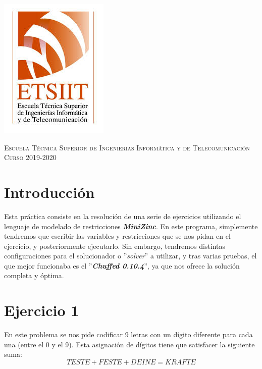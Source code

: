 \documentclass[11pt,a4paper]{article}
\begin{document}
\begin{titlepage}
\begin{minipage}{\textwidth}
\includegraphics[scale=0.3]{img/etsiit.jpeg}

\vspace{0.7cm}
\textsc{Escuela Técnica Superior de Ingenierías Informática y de Telecomunicación}\\
\vspace{1cm}
\textsc{Curso 2019-2020}
\end{minipage}
\end{titlepage}

\tableofcontents
\thispagestyle{empty}				%

\newpage

\setlength{\parskip}{1em}
\setcounter{page}{1}

\section*{Introducción}

Esta práctica consiste en la resolución de una serie de ejercicios utilizando el lenguaje de modelado de restricciones \textbf{\textit{MiniZinc}}.
En este programa, simplemente tendremos que escribir las variables y restricciones que se nos pidan en el ejercicio, y posteriormente ejecutarlo.
Sin embargo, tendremos distintas configuraciones para el solucionador o ''\textit{solver}'' a utilizar, y tras varias pruebas, el que mejor
funcionaba es el ''\textbf{\textit{Chuffed 0.10.4}}'', ya que nos ofrece la solución completa y óptima.



\section*{Ejercicio 1}
En este problema se nos pide codificar 9 letras con un dígito diferente para cada una (entre el 0 y el 9). Esta asignación de dígitos tiene que
satisfacer la siguiente suma:
\begin{equation*}
    TESTE+FESTE+DEINE=KRAFTE
\end{equation*}
\end{document}
